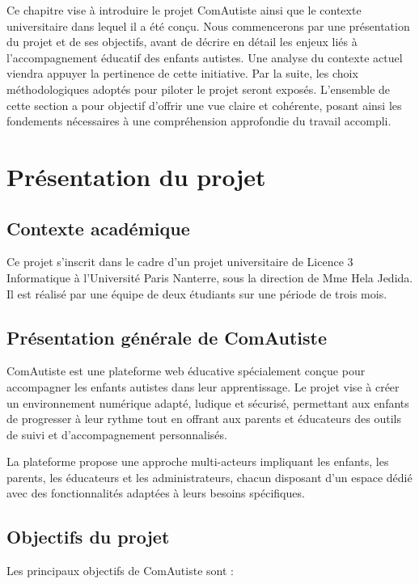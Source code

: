 \documentclass[12pt,a4paper]{report}
\begin{document}
Ce chapitre vise à introduire le projet ComAutiste ainsi que le contexte universitaire dans lequel il a été conçu. Nous commencerons par une présentation du projet et de ses objectifs, avant de décrire en détail les enjeux liés à l'accompagnement éducatif des enfants autistes. Une analyse du contexte actuel viendra appuyer la pertinence de cette initiative. Par la suite, les choix méthodologiques adoptés pour piloter le projet seront exposés. L'ensemble de cette section a pour objectif d'offrir une vue claire et cohérente, posant ainsi les fondements nécessaires à une compréhension approfondie du travail accompli.

\section{Présentation du projet}

\subsection{Contexte académique}

Ce projet s'inscrit dans le cadre d'un projet universitaire de Licence 3 Informatique à l'Université Paris Nanterre, sous la direction de Mme Hela Jedida. Il est réalisé par une équipe de deux étudiants sur une période de trois mois.

\subsection{Présentation générale de ComAutiste}

ComAutiste est une plateforme web éducative spécialement conçue pour accompagner les enfants autistes dans leur apprentissage. Le projet vise à créer un environnement numérique adapté, ludique et sécurisé, permettant aux enfants de progresser à leur rythme tout en offrant aux parents et éducateurs des outils de suivi et d'accompagnement personnalisés.

La plateforme propose une approche multi-acteurs impliquant les enfants, les parents, les éducateurs et les administrateurs, chacun disposant d'un espace dédié avec des fonctionnalités adaptées à leurs besoins spécifiques.

\subsection{Objectifs du projet}

Les principaux objectifs de ComAutiste sont :
\end{document}
